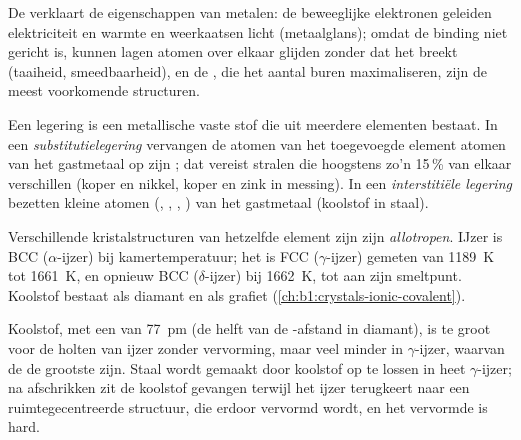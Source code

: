 \begin{proposition}\label{prop:b1:crystals-metals:properties}
De  verklaart de eigenschappen van metalen: de beweeglijke
elektronen geleiden elektriciteit en warmte en weerkaatsen licht
(metaalglans); omdat de binding niet gericht is, kunnen lagen atomen over
elkaar glijden zonder dat het  breekt (taaiheid, smeedbaarheid),
en de , die het aantal buren maximaliseren, zijn de
meest voorkomende structuren.
\end{proposition}
\admitted

\begin{definition}[Legeringen]\label{def:b1:crystals-metals:alloy}
Een legering is een metallische vaste stof die uit meerdere elementen
bestaat. In een \emph{substitutielegering}
vervangen de atomen van het toegevoegde element atomen van het
gastmetaal op zijn ; dat vereist stralen die hoogstens zo'n
15\,\% van elkaar verschillen (koper en nikkel, koper en zink in
messing). In een \emph{interstitiële legering}
bezetten kleine atomen (, , , )  van het gastmetaal (koolstof in staal).
\end{definition}

\begin{definition}[Allotropie]\label{def:b1:crystals-metals:allotropy}
Verschillende kristalstructuren van hetzelfde element zijn zijn
\emph{allotropen}. IJzer is BCC ($\alpha$-ijzer) bij
kamertemperatuur; het is FCC ($\gamma$-ijzer) gemeten van \qty{1189}{K}
tot \qty{1661}{K}, en opnieuw BCC ($\delta$-ijzer) bij \qty{1662}{K}, tot
aan zijn smeltpunt. Koolstof bestaat als diamant en als grafiet
(\cref{ch:b1:crystals-ionic-covalent}).
\end{definition}


\begin{example}[Staal]\label{ex:b1:crystals-metals:steel}
Koolstof, met een  van \qty{77}{pm} (de helft van de
-afstand in diamant), is te groot voor de holten van ijzer
zonder vervorming, maar veel minder in $\gamma$-ijzer, waarvan de
 de grootste zijn. Staal wordt gemaakt door koolstof
op te lossen in heet $\gamma$-ijzer; na afschrikken zit de koolstof
gevangen terwijl het ijzer terugkeert naar een ruimtegecentreerde
structuur, die erdoor vervormd wordt, en het vervormde  is hard.
\end{example}


